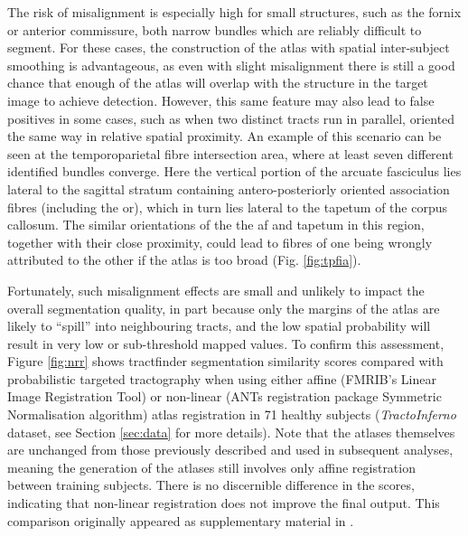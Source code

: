 The risk of misalignment is especially high for small structures, such as the fornix or anterior commissure, both narrow bundles which are reliably difficult to segment.
For these cases, the construction of the atlas with spatial inter-subject smoothing is advantageous, as even with slight misalignment there is still a good chance that enough of the atlas will overlap with the structure in the target image to achieve detection.
However, this same feature may also lead to false positives in some cases, such as when two distinct tracts run in parallel, oriented the same way in relative spatial proximity.
An example of this scenario can be seen at the temporoparietal fibre intersection area, where at least seven different identified bundles converge\autocite{Martino2013}.
Here the vertical portion of the arcuate fasciculus lies lateral to the sagittal stratum containing antero-posteriorly oriented association fibres (including the \gls{or}), which in turn lies lateral to the tapetum of the corpus callosum.
The similar orientations of the the \gls{af} and tapetum in this region, together with their close proximity, could lead to fibres of one being wrongly attributed to the other if the atlas is too broad (Fig. \ref{fig:tpfia}).

\begin{SCfigure}[][h!]
  
  \caption[Atlas misalignment with linear registration]{Example of potential for atlas misalignment. The  (A) and tapetum (T) are proximal and parallel at the temporoparietal fibre intersection area. Linearly registered right  atlas  may overlap with the tapetum (arrowhead).}
  \label{fig:tpfia}
\end{SCfigure}

Fortunately, such misalignment effects are small and unlikely to impact the overall segmentation quality, in part because only the margins of the atlas are likely to ``spill'' into neighbouring tracts, and the low spatial probability will result in very low or sub-threshold mapped values.
To confirm this assessment, Figure \ref{fig:nrr} shows tractfinder segmentation similarity scores compared with probabilistic targeted tractography when using either affine (FMRIB's Linear Image Registration Tool\autocite{Jenkinson2002}) or non-linear (ANTs registration package Symmetric Normalisation algorithm\autocite{Tustison2013,Avants2011}) atlas registration in 71 healthy subjects (\textit{TractoInferno} dataset, see Section \ref{sec:data} for more details).
Note that the atlases themselves are unchanged from those previously described and used in subsequent analyses, meaning the generation of the atlases still involves only affine registration between training subjects.
There is no discernible difference in the scores, indicating that non-linear registration does not improve the final output.
This comparison originally appeared as supplementary material in \textcite{Young2024}.

